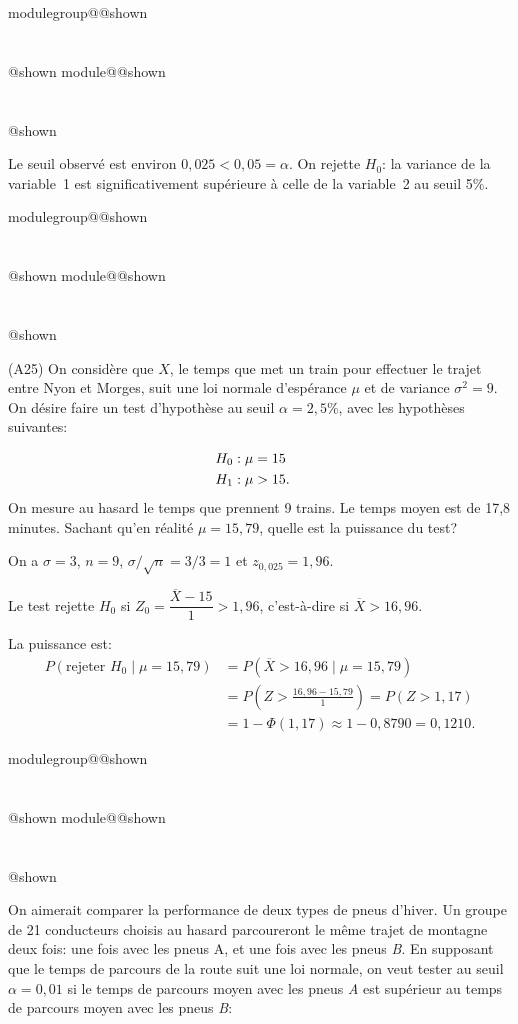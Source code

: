 \documentclass{Evaluation}
\makeatletter
\newcommand{\currentmodulekey}{}
\newcommand{\currentmoduletitle}{}
\newcommand{\currentgroupkey}{}
\newcommand{\currentgrouptitle}{}
\newcommand{\showmoduleifneeded}{%
  \ifx\currentgroupkey\empty\else
    \expandafter\ifx\csname modulegroup@\currentgroupkey @shown\endcsname\relax
      \section*{\currentgrouptitle}%
      \expandafter\gdef\csname modulegroup@\currentgroupkey @shown\endcsname{1}%
    \fi
  \fi
  \expandafter\ifx\csname module@\currentmodulekey @shown\endcsname\relax
    \section*{\currentmoduletitle}%
    \expandafter\gdef\csname module@\currentmodulekey @shown\endcsname{1}%
  \fi
}
\newenvironment{A24}{\showmoduleifneeded}{}
\newenvironment{A25}{\showmoduleifneeded}{}
\makeatother
\begin{document}
\begin{questions}
\begin{A24}
\begin{parts}
\begin{solution}
Le seuil observé est environ $0{,}025 < 0{,}05 = \alpha$. On rejette $H_0$: la variance de la variable~1 est significativement supérieure à celle de la variable~2 au seuil 5\%.
\end{solution}

\end{parts}
\end{A24}

\begin{A25}
\question {}\label{puissance} (A25)
On considère que $X$, le temps que met un train pour effectuer le trajet entre Nyon et Morges, suit une loi normale d'espérance $\mu$ et de variance $\sigma^2=9$. On désire faire un test d'hypothèse au seuil $\alpha = 2,5\%$, avec les hypothèses suivantes:

\begin{align*}
	H_0&: \mu=15\cr
	H_1&: \mu > 15.
\end{align*}
On mesure au hasard le temps que prennent 9 trains. Le temps moyen est de 17,8 minutes. Sachant qu'en réalité $\mu = 15,79$, quelle est la puissance du test?

\begin{solution}
On a $\sigma = 3$, $n = 9$, $\sigma/\sqrt{n} = 3/3 = 1$ et $z_{0{,}025} = 1{,}96$.

Le test rejette $H_0$ si $Z_0 = \dfrac{\overline{X} - 15}{1} > 1{,}96$, c'est-à-dire si $\overline{X} > 16{,}96$.

La puissance est:
\begin{align*}
P(\text{rejeter } H_0 \mid \mu = 15{,}79) &= P(\overline{X} > 16{,}96 \mid \mu = 15{,}79) \\
&= P\!\left(Z > \frac{16{,}96 - 15{,}79}{1}\right) = P(Z > 1{,}17) \\
&= 1 - \Phi(1{,}17) \approx 1 - 0{,}8790 = 0{,}1210.
\end{align*}
\end{solution}
\end{A25}

\begin{A25}
\question {} %

On aimerait comparer la performance de deux types de pneus d'hiver. Un groupe de 21 conducteurs choisis au hasard parcoureront le même trajet de montagne deux fois: une fois avec les pneus {A}, et une fois avec les pneus {\it B}. En supposant que le temps de parcours de la route suit une loi normale, on veut tester au seuil $\alpha=0,01$ si le temps de parcours moyen avec les pneus {\it A} est supérieur au temps de parcours moyen avec les pneus {\it B}:




\end{A25}
\end{questions}
\end{document}

